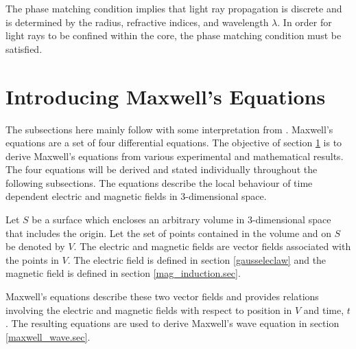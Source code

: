 \documentclass[12pt]{article}
\theoremstyle{definition}
\numberwithin{equation}{section}
\begin{document}
The phase matching condition implies that light ray propagation is discrete and is determined by the radius, refractive indices, and wavelength $\lambda$. In order for light rays to be confined within the core, the phase matching condition must be satisfied.
\section{Introducing Maxwell's Equations}
\label{maxwellsequations}
The subsections here mainly follow \cite{Reitz} with some interpretation from \cite{Flei}. Maxwell's equations are a set of four differential equations. The objective of section \ref{maxwellsequations} is to derive Maxwell's equations from various experimental and mathematical results. The four equations will be derived and stated individually throughout the following subsections. The equations describe the local behaviour of time dependent electric and magnetic fields in 3-dimensional space.

Let $S$ be a surface which encloses an arbitrary volume in 3-dimensional space that includes the origin. Let the set of points contained in the volume and on $S$ be denoted by $V$. The electric and magnetic fields are vector fields associated with the points in $V$. The electric field is defined in section \ref{gausseleclaw} and the magnetic field is defined in section \ref{mag_induction.sec}.

Maxwell's equations describe these two vector fields and provides relations involving the electric and magnetic fields with respect to position in $V$ and time, $t$. The resulting equations are used to derive Maxwell's wave equation in section \ref{maxwell_wave.sec}.
\end{document}
